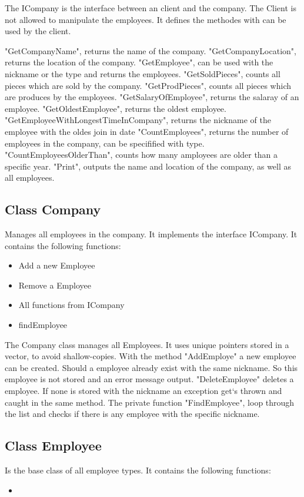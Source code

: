 The ICompany is the interface between an client and the company. The Client is not allowed to manipulate the employees.
It defines the methodes with can be used by the client.

"GetCompanyName", returns the name of the company.
"GetCompanyLocation", returns the location of the company.
"GetEmployee", can be used with the nickname or the type and returns the employees.
"GetSoldPieces", counts all pieces which are sold by the company.
"GetProdPieces", counts all pieces which are produces by the employees.
"GetSalaryOfEmployee", returns the salaray of an employee.
"GetOldestEmployee", returns the oldest employee.
"GetEmployeeWithLongestTimeInCompany", returns the nickname of the employee with the oldes join in date
"CountEmployees", returns the number of employees in the company, can be specifified with type.
"CountEmployeesOlderThan", counts how many amployees are older than a specific year.
"Print", outputs the name and location of the company, as well as all employees.

\subsection{Class Company}
Manages all employees in the company. It implements the interface ICompany.
It contains the following functions:
\begin{itemize}
	\item Add a new Employee
	\item Remove a Employee
	\item All functions from ICompany
	\item findEmployee
\end{itemize}

The Company class manages all Employees. It uses unique pointers stored in a vector, to avoid shallow-copies.
With the method "AddEmploye" a new employee can be created. Should a employee already exist with the same nickname. So this employee is not stored and an error message output.
"DeleteEmployee" deletes a employee. If none is stored with the nickname an exception get`s thrown and caught in the same method.
The private function "FindEmployee", loop through the list and checks if there is any employee with the specific nickname.

\subsection{Class Employee}
Is the base class of all employee types.
It contains the following functions:
\begin{itemize}
	\item 
\end{itemize}

